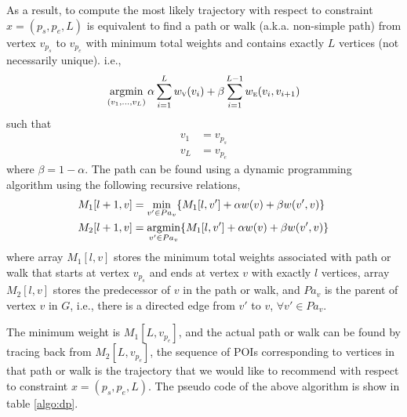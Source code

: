 As a result, to compute the most likely trajectory with respect to constraint $x = (p_s, p_e, L)$ is
equivalent to find a path or walk (a.k.a. non-simple path) from vertex $v_{p_s}$ to $v_{p_e}$ 
with minimum total weights and contains exactly $L$ vertices (not necessarily unique).
i.e.,
\begin{displaymath}
    \operatorname*{argmin}_{(v_1, \dots, v_L)} \alpha \sum_{i=1}^{L} w_{\textsc{v}}(v_i) + 
                                       \beta \sum_{i=1}^{L-1} w_{\textsc{e}}(v_i, v_{i+1})
\end{displaymath}
such that
\begin{align*}
    v_1 &= v_{p_s} \\
    v_L &= v_{p_e} 
\end{align*}
where $\beta = 1 - \alpha$.
The path can be found using a dynamic programming algorithm using the following recursive relations,
\begin{align*}
    M_1[l+1, v] &= \min_{v' \in Pa_v} \{ M_1[l, v'] + \alpha w(v) + \beta w(v', v) \} \\
    M_2[l+1, v] &= \operatorname*{argmin}_{v' \in Pa_v} \{ M_1[l, v'] + \alpha w(v) + \beta w(v', v) \} 
\end{align*}
where array $M_1[l, v]$ stores the minimum total weights associated with path or walk
that starts at vertex $v_{p_s}$ and ends at vertex $v$ with exactly $l$ vertices,
array $M_2[l, v]$ stores the predecessor of $v$ in the path or walk,
and $Pa_v$ is the parent of vertex $v$ in $G$,
i.e., 
there is a directed edge from $v'$ to $v$, $\forall v' \in Pa_v$.

The minimum weight is $M_1[L, v_{p_e}]$,
and the actual path or walk can be found by tracing back from $M_2[L, v_{p_e}]$,
the sequence of POIs corresponding to vertices in that path or walk is the 
trajectory that we would like to recommend with respect to constraint $ x = (p_s, p_e, L)$.
The pseudo code of the above algorithm is show in table \ref{algo:dp}.

